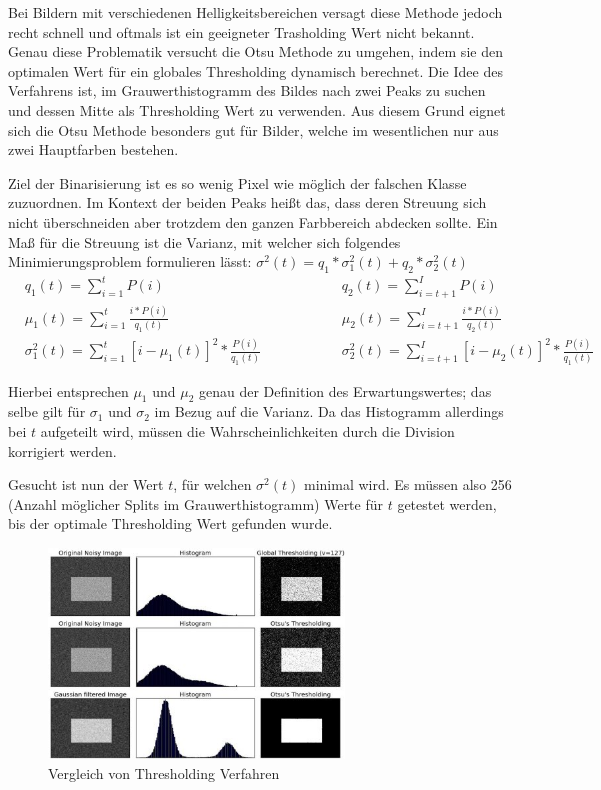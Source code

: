 \documentclass[a4paper, oneside, 12pt]{article}
\begin{document}
Bei Bildern mit verschiedenen Helligkeitsbereichen versagt diese Methode jedoch recht schnell und oftmals ist ein geeigneter Trasholding Wert nicht bekannt. Genau diese Problematik versucht die Otsu Methode zu umgehen, indem sie den optimalen Wert für ein globales Thresholding dynamisch berechnet. Die Idee des Verfahrens ist, im Grauwerthistogramm des Bildes nach zwei Peaks zu suchen und dessen Mitte als Thresholding Wert zu verwenden. Aus diesem Grund eignet sich die Otsu Methode besonders gut für Bilder, welche im wesentlichen nur aus zwei Hauptfarben bestehen.

Ziel der Binarisierung ist es so wenig Pixel wie möglich der falschen Klasse zuzuordnen. Im Kontext der beiden Peaks heißt das, dass deren Streuung sich nicht überschneiden aber trotzdem den ganzen Farbbereich abdecken sollte. Ein Maß für die Streuung ist die Varianz, mit welcher sich folgendes Minimierungsproblem formulieren lässt: $\sigma^2(t) = q_1 * \sigma^2_1(t) + q_2 * \sigma^2_2(t)$
\begin{align*}
	&q_1(t) = \sum_{i=1}^{t} P(i)
	&&q_2(t) = \sum_{i=t+1}^{I} P(i)\\
	&\mu_1(t) = \sum_{i=1}^{t} \frac{i * P(i)}{q_1(t)}
	&&\mu_2(t) = \sum_{i=t+1}^{I} \frac{i * P(i)}{q_2(t)}\\
	&\sigma^2_1(t) = \sum_{i=1}^{t} [i - \mu_1(t)]^2 * \frac{P(i)}{q_1(t)} \hspace{50pt}
	&&\sigma^2_2(t) = \sum_{i=t+1}^{I} [i - \mu_2(t)]^2 * \frac{P(i)}{q_1(t)}
\end{align*}

Hierbei entsprechen $\mu_1$ und $\mu_2$ genau der Definition des Erwartungswertes; das selbe gilt für $\sigma_1$ und $\sigma_2$ im Bezug auf die Varianz. Da das Histogramm allerdings bei $t$ aufgeteilt wird, müssen die Wahrscheinlichkeiten durch die Division korrigiert werden.

Gesucht ist nun der Wert $t$, für welchen $\sigma^2(t)$ minimal wird. Es müssen also 256 (Anzahl möglicher Splits im Grauwerthistogramm) Werte für $t$ getestet werden, bis der optimale Thresholding Wert gefunden wurde.

\begin{figure}[h]
	\centering
	\includegraphics[width=0.7\textwidth]{images/otsu.jpg}
	\caption{Vergleich von Thresholding Verfahren}
	\label{fig:otsu}
\end{figure}
\end{document}
